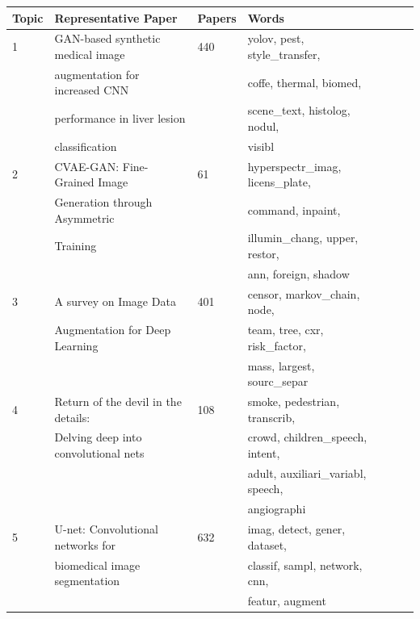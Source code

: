 \begin{table}
    \begin{center}
    \begin{tabular*}{\textwidth}{@{\extracolsep{\fill}}lllllll@{\extracolsep{\fill}}}
        \toprule
        Topic & Representative Paper & Papers & Words\\
        \midrule
        1 & GAN-based synthetic medical image & 440 & yolov, pest, style\_transfer, \\
          & augmentation for increased CNN && coffe, thermal, biomed, \\
          & performance in liver lesion && scene\_text, histolog, nodul, \\
        \vspace{.2cm}& classification && visibl \\
        
        2 & CVAE-GAN: Fine-Grained Image & 61 & hyperspectr\_imag, licens\_plate, \\
          & Generation through Asymmetric && command, inpaint, \\
          & Training && illumin\_chang, upper, restor, \\
        \vspace{.2cm}  &&& ann, foreign, shadow \\
        
        3 & A survey on Image Data & 401 & censor, markov\_chain, node, \\ 
          & Augmentation for Deep Learning && team, tree, cxr, risk\_factor, \\
        \vspace{.2cm}  &&&mass, largest, sourc\_separ\\
        
        4 & Return of the devil in the details: & 108 & smoke, pedestrian, transcrib, \\
          & Delving deep into convolutional nets && crowd, children\_speech, intent, \\
          &&&adult, auxiliari\_variabl, speech, \\
        \vspace{.2cm}  &&&angiographi \\
        
        5 & U-net: Convolutional networks for & 632 & imag, detect, gener, dataset, \\
          & biomedical image segmentation && classif, sampl, network, cnn, \\
        \vspace{.2cm}  &&&featur, augment\\
        

\end{tabular*}
\end{center}
\end{table}
